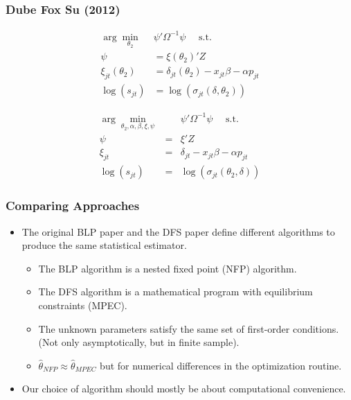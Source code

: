 \documentclass[aspectratio=169,10pt]{beamer}
\begin{document}
 \begin{frame}\frametitle{Dube Fox Su (2012)}
\footnotesize
\begin{align}
\label{blpnfxp}
\nonumber \arg \min_{\theta_2} & \psi' \Omega^{-1} \psi \quad \mbox{ s.t. } \\
\nonumber \psi &= \xi(\theta_2)' Z\\
\xi_{jt}(\theta_2) &= \delta_{jt}(\theta_2) - x_{jt} \beta - \alpha p_{jt} \\
\nonumber \log(s_{jt})  &= \log(\sigma_{jt}(\delta,\theta_2))
\end{align}

\begin{eqnarray}
\label{blpmpec}
\nonumber \arg \min_{\theta_2,\alpha,\beta, \xi,\psi} && \psi' \Omega^{-1}  \psi \quad \mbox{ s.t. } \\
 \psi &=& \xi' Z\\
\nonumber \xi_{jt} &=& \delta_{jt} - x_{jt} \beta - \alpha p_{jt} \\
\nonumber \log(s_{jt})  &=& \log(\sigma_{jt}(\theta_2, \delta))
\end{eqnarray}
\end{frame}

\begin{frame}
\frametitle{Comparing Approaches}
\begin{itemize}
\item The original BLP paper and the DFS paper define different \alert{algorithms} to produce the same statistical \alert{estimator}.
\begin{itemize}
\item The BLP algorithm is a \alert{nested fixed point} (NFP) algorithm. 
\item The DFS algorithm is a \alert{mathematical program with equilibrium constraints} (MPEC).
\item The unknown parameters satisfy the same set of first-order conditions. (Not only asymptotically, but in finite sample).
\item $\hat{\theta}_{NFP} \approx \hat{\theta}_{MPEC}$ but for numerical differences in the optimization routine.
\end{itemize}
\item Our choice of algorithm should mostly be about computational convenience.
\end{itemize}
\end{frame}
\end{document}
